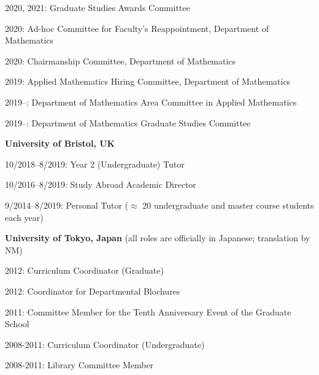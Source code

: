\documentclass[11pt,letter]{article}
\renewenvironment{itemize}{
  \begin{list}{}{
    \setlength{\leftmargin}{1.5em}
    \setlength{\itemsep}{0.25em}
    \setlength{\parskip}{0pt}
    \setlength{\parsep}{0.25em}
  }
}{
  \end{list}
}
\begin{document}
\begin{itemize}
\item 2020, 2021: Graduate Studies Awards Committee

\item 2020: Ad-hoc Committee for Faculty's Reappointment, Department of Mathematics

\item 2020: Chairmanship Committee, Department of Mathematics

\item 2019: Applied Mathematics Hiring Committee, Department of Mathematics

\item 2019--: Department of Mathematics Area Committee in Applied Mathematics

\item 2019--: Department of Mathematics Graduate Studies Committee

 
\item \textbf{University of Bristol, UK}

\item 10/2018--8/2019: Year 2 (Undergraduate) Tutor 

\item 10/2016--8/2019: Study Abroad Academic Director

\item 9/2014--8/2019: Personal Tutor ($\approx$ 20 undergraduate and master course students each year)

\item \textbf{University of Tokyo, Japan} (all roles are officially in Japanese; translation by NM)

\item 2012: Curriculum Coordinator (Graduate)

\item 2012: Coordinator for Departmental Blochures

\item 2011: Committee Member for the Tenth Anniversary Event of the Graduate School

\item 2008-2011: Curriculum Coordinator (Undergraduate)

\item 2008-2011: Library Committee Member


\end{itemize}
\end{document}
